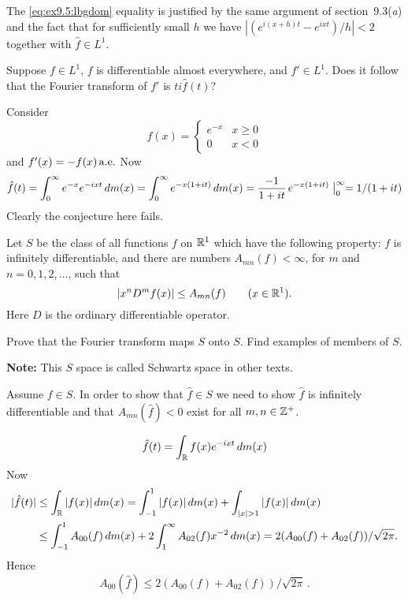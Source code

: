 \begin{enumerate}
The \eqref{eq:ex9.5:lbgdom} equality is justified by the same argument
of section~9.3(\emph{a}) and the fact that for sufficiently small $h$
we have \(|(e^{i(x+h)t} - e^{ixt})/h|<2\) together with \(\hat{f}\in L^1\).

\begin{excopy}
Suppose  \(f\in L^1\), $f$ is differentiable almost everywhere,
and \(f'\in L^1\). Does it follow that the Fourier transform
of \(f'\) is \(ti\hat{f}(t)\)?
\end{excopy}

Consider
\begin{equation*}
f(x) = \left\{
  \begin{array}{ll}
  e^{-x} & x \geq 0\\
  0     & x < 0
  \end{array}
  \right.
\end{equation*}
and \(f'(x) = -f(x)\,\textrm{a.e.}\) Now
\begin{equation*}
\hat{f}(t) 
 = \int_0^\infty e^{-x}e^{-ixt}\,dm(x)
 = \int_0^\infty e^{-x(1+it)}\,dm(x)
 = \frac{-1}{1+it}\,e^{-x(1+it)}\bigm|_0^\infty
 = 1/(1+it)
\end{equation*}
Clearly the conjecture here fails.


\begin{excopy} 
Let 
\label{ex:Amn}
$S$ be the class of all functions $f$ on \(\mathbb{R}^1\) which have
the following property:
$f$ is infinitely differentiable,
and there are numbers \(A_{m n}(f)<\infty\),
for $m$ and \(n=0,1,2,\ldots\), such that
\begin{equation*}
\left| x^nD^m f(x)\right| \leq A_{m n}(f) \qquad (x\in\mathbb{R}^1).
\end{equation*}
Here $D$ is the ordinary differentiable operator.

Prove that the Fourier transform maps $S$ onto $S$.
Find examples of members of $S$.
\end{excopy}

\textbf{Note:} This $S$ space is called
Schwartz space in other texts.

Assume \(f\in S\).
In order to show that \(\hat{f}\in S\) we need to show
\(\hat{f}\) is infinitely differentiable and 
that \(A_{mn}(\hat{f})<0\) exist for all \(m,n\in\mathbb{Z}^+\).

\begin{equation*}
\hat{f}(t) = \int_{\mathbb{R}} f(x)e^{-ixt}\,dm(x)
\end{equation*}
Now
\begin{align*}
|\hat{f}(t)| 
 &\leq \int_{\R} |f(x)|\,dm(x)
  = \int_{-1}^1 |f(x)|\,dm(x) + \int_{|x|>1} |f(x)|\,dm(x) \\
 & \leq \int_{-1}^1 A_{00}(f)\,dm(x) + 2\int_1^\infty A_{02}(f)x^{-2}\,dm(x)
  = 2(A_{00}(f) + A_{02}(f)) /\sqrt{2\pi}.
\end{align*}
Hence 
\begin{equation} \label{eq:A00}
A_{00}(\hat{f}) \leq 2(A_{00}(f) + A_{02}(f)) /\sqrt{2\pi}\,.
\end{equation}


\end{enumerate}
